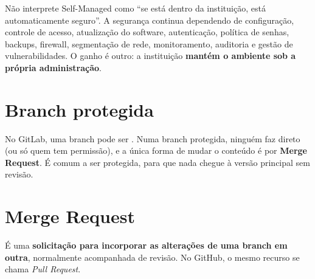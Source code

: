 \begin{atencao}
Não interprete Self-Managed como \enquote{se está dentro da instituição, está automaticamente seguro}. A segurança continua dependendo de configuração, controle de acesso, atualização do software, autenticação, política de senhas, backups, firewall, segmentação de rede, monitoramento, auditoria e gestão de vulnerabilidades. O ganho é outro: a instituição \textbf{mantém o ambiente sob a própria administração}.
\end{atencao}

\section{Branch protegida}

No GitLab, uma branch pode ser . Numa branch protegida, ninguém faz  direto (ou só quem tem permissão), e a única forma de mudar o conteúdo é por \textbf{Merge Request}. É comum a  ser protegida, para que nada chegue à versão principal sem revisão.

\section{Merge Request}

\begin{conceito}
É uma \textbf{solicitação para incorporar as alterações de uma branch em outra}, normalmente acompanhada de revisão. No GitHub, o mesmo recurso se chama \emph{Pull Request}.
\end{conceito}

\begin{center}
\end{center}

